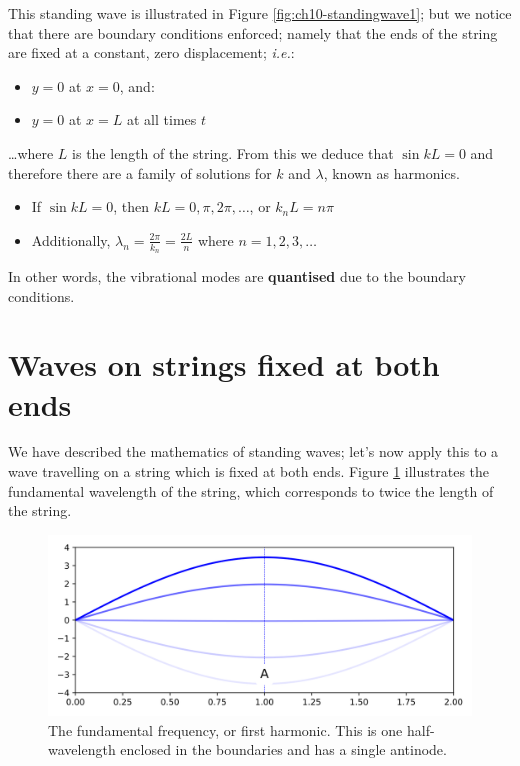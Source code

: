 \documentclass[
]{book}
\providecommand{\tightlist}{%
  \setlength{\itemsep}{0pt}\setlength{\parskip}{0pt}}
\begin{document}
This standing wave is illustrated in Figure \ref{fig:ch10-standingwave1}; but we notice that there are boundary conditions enforced; namely that the ends of the string are fixed at a constant, zero displacement; \emph{i.e.}:

\begin{itemize}
\tightlist
\item
  \(y = 0\) at \(x = 0\), and:
\item
  \(y = 0\) at \(x = L\) at all times \(t\)
\end{itemize}

\ldots where \(L\) is the length of the string. From this we deduce that \(\sin kL = 0\) and therefore there are a family of solutions for \(k\) and \(\lambda\), known as harmonics.

\begin{itemize}
\tightlist
\item
  If \(\sin kL = 0\), then \(kL = 0, \pi, 2\pi, \dots\), or \(k_n L = n\pi\)
\item
  Additionally, \(\lambda_n = \frac{2\pi}{k_n} = \frac{2L}{n}\) where \(n = 1, 2, 3, \dots\)
\end{itemize}

In other words, the vibrational modes are \textbf{quantised} due to the boundary conditions.

\hypertarget{sec:ch10-fixedstring1}{%
\section{Waves on strings fixed at both ends}\label{sec:ch10-fixedstring1}}

We have described the mathematics of standing waves; let's now apply this to a wave travelling on a string which is fixed at both ends. Figure \ref{fig:ch10-stringfundamental1} illustrates the fundamental wavelength of the string, which corresponds to twice the length of the string.

\begin{figure}

{\centering \includegraphics[width=0.7\linewidth]{visualisations/ch10-standingwave_stages-n1} 

}

\caption{The fundamental frequency, or first harmonic. This is one half-wavelength enclosed in the boundaries and has a single antinode.}\label{fig:ch10-stringfundamental1}
\end{figure}
\end{document}
